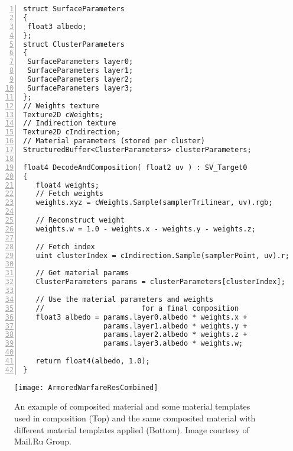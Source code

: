 \begin{lstlisting}[float=b,caption={An example of cluster decoding.},label=Makeev-ClusterDecode,numbers=left]
struct SurfaceParameters
{
 float3 albedo;
};
struct ClusterParameters
{
 SurfaceParameters layer0;
 SurfaceParameters layer1;
 SurfaceParameters layer2;
 SurfaceParameters layer3;
};
// Weights texture
Texture2D cWeights;
// Indirection texture
Texture2D cIndirection;
// Material parameters (stored per cluster)
StructuredBuffer<ClusterParameters> clusterParameters;

float4 DecodeAndComposition( float2 uv ) : SV_Target0
{
   float4 weights;
   // Fetch weights
   weights.xyz = cWeights.Sample(samplerTrilinear, uv).rgb;

   // Reconstruct weight
   weights.w = 1.0 - weights.x - weights.y - weights.z;

   // Fetch index
   uint clusterIndex = cIndirection.Sample(samplerPoint, uv).r;

   // Get material params 
   ClusterParameters params = clusterParameters[clusterIndex];

   // Use the material parameters and weights
   //                       for a final composition
   float3 albedo = params.layer0.albedo * weights.x +
                   params.layer1.albedo * weights.y +
                   params.layer2.albedo * weights.z +
                   params.layer3.albedo * weights.w;

   return float4(albedo, 1.0);
}
\end{lstlisting}

\begin{figure}\centering
\texttt{[image: ArmoredWarfareResCombined]}
\caption{
An example of composited material and some material templates used in composition (Top) and the same composited material with different material templates applied (Bottom).
Image courtesy of Mail.Ru Group.
} \label{Makeev-AWRes}
\end{figure}



\FloatBarrier



